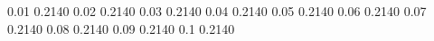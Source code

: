 0.01 0.2140
0.02 0.2140
0.03 0.2140
0.04 0.2140
0.05 0.2140
0.06 0.2140
0.07 0.2140
0.08 0.2140
0.09 0.2140
0.1	 0.2140
